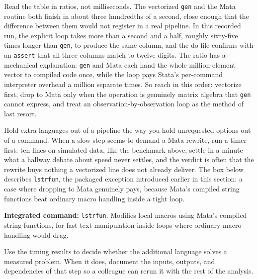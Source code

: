 Read the table in ratios, not milliseconds. The vectorized \texttt{gen} and the Mata routine both finish in about three hundredths of a second, close enough that the difference between them would not register in a real pipeline. In this recorded run, the explicit loop takes more than a second and a half, roughly sixty-five times longer than \texttt{gen}, to produce the same column, and the do-file confirms with an \texttt{assert} that all three columns match to twelve digits. The ratio has a mechanical explanation: \texttt{gen} and Mata each hand the whole million-element vector to compiled code once, while the loop pays Stata's per-command interpreter overhead a million separate times. So reach in this order: vectorize first, drop to Mata only when the operation is genuinely matrix algebra that \texttt{gen} cannot express, and treat an observation-by-observation loop as the method of last resort.

Hold extra languages out of a pipeline the way you hold unrequested options out of a command. When a slow step seems to demand a Mata rewrite, run a timer first: ten lines on simulated data, like the benchmark above, settle in a minute what a hallway debate about speed never settles, and the verdict is often that the rewrite buys nothing a vectorized line does not already deliver. The box below describes \texttt{lstrfun}, the packaged exception introduced earlier in this section: a case where dropping to Mata genuinely pays, because Mata's compiled string functions beat ordinary macro handling inside a tight loop.

\begin{kaobox}[frametitle=Package Integration: \texttt{lstrfun}]
\textbf{Integrated command:} \texttt{lstrfun}. Modifies local macros using Mata's compiled string functions, for fast text manipulation inside loops where ordinary macro handling would drag.
\end{kaobox}

Use the timing results to decide whether the additional language solves a measured problem. When it does, document the inputs, outputs, and dependencies of that step so a colleague can rerun it with the rest of the analysis.

